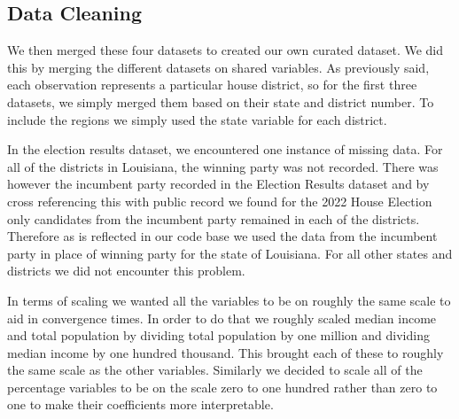 \documentclass[12pt]{article}
\begin{document}
\FloatBarrier
\subsection*{Data Cleaning}

We then merged these four datasets to created our own curated dataset. We did this by merging the different datasets on shared variables. As previously said, each observation represents a particular house district, so for the first three datasets, we simply merged them based on their state and district number. To include the regions we simply used the state variable for each district. 


In the election results dataset, we encountered one instance of missing data. For all of the districts in Louisiana, the winning party was not recorded. There was however the incumbent party recorded  in the Election Results dataset and by cross referencing this with public record we found for the 2022 House Election only candidates from the incumbent party remained in each of the districts. Therefore as is reflected in our code base we used the data from the incumbent party in place of winning party for the state of Louisiana. For all other states and districts we did not encounter this problem. 

In terms of scaling we wanted all the variables to be on roughly the same scale to aid in convergence times. In order to do that we roughly scaled median income and total population by dividing total population by one million and dividing median income by one hundred thousand. This brought each of these to roughly the same scale as the other variables. Similarly we decided to scale all of the percentage variables to be on the scale zero to one hundred rather than zero to one to make their coefficients more interpretable.  


\end{document}
